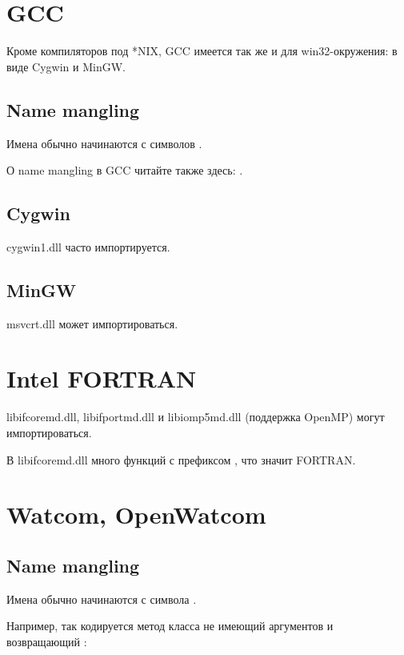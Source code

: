 \section{GCC}

Кроме компиляторов под *NIX, GCC имеется так же и для win32-окружения: в виде Cygwin и MinGW.

\subsection{Name mangling}

Имена обычно начинаются с символов .

О \gls{name mangling} в GCC читайте также здесь: .

\subsection{Cygwin}

cygwin1.dll часто импортируется.

\subsection{MinGW}

msvcrt.dll может импортироваться.

\section{Intel FORTRAN}

libifcoremd.dll, libifportmd.dll и libiomp5md.dll (поддержка OpenMP) могут импортироваться.

В libifcoremd.dll много функций с префиксом , что значит FORTRAN.

\section{Watcom, OpenWatcom}

\subsection{Name mangling}

Имена обычно начинаются с символа .

Например, так кодируется метод  класса  не имеющий аргументов и возвращающий \Tvoid{}:

